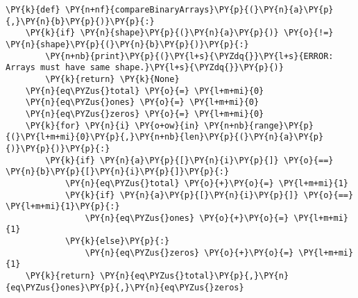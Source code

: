 
{\par%
\vspace{-1\baselineskip}%
}%
\begin{notebookcell}[]%
\begin{addmargin}[\cellleftmargin]{0em}%
{\smaller%
\par%
%
\vspace{-1\smallerfontscale}%
\begin{Verbatim}[commandchars=\\\{\}]
\PY{k}{def} \PY{n+nf}{compareBinaryArrays}\PY{p}{(}\PY{n}{a}\PY{p}{,}\PY{n}{b}\PY{p}{)}\PY{p}{:}
    \PY{k}{if} \PY{n}{shape}\PY{p}{(}\PY{n}{a}\PY{p}{)} \PY{o}{!=} \PY{n}{shape}\PY{p}{(}\PY{n}{b}\PY{p}{)}\PY{p}{:}
        \PY{n+nb}{print}\PY{p}{(}\PY{l+s}{\PYZdq{}}\PY{l+s}{ERROR: Arrays must have same shape.}\PY{l+s}{\PYZdq{}}\PY{p}{)}
        \PY{k}{return} \PY{k}{None}
    \PY{n}{eq\PYZus{}total} \PY{o}{=} \PY{l+m+mi}{0}
    \PY{n}{eq\PYZus{}ones} \PY{o}{=} \PY{l+m+mi}{0}
    \PY{n}{eq\PYZus{}zeros} \PY{o}{=} \PY{l+m+mi}{0}
    \PY{k}{for} \PY{n}{i} \PY{o+ow}{in} \PY{n+nb}{range}\PY{p}{(}\PY{l+m+mi}{0}\PY{p}{,}\PY{n+nb}{len}\PY{p}{(}\PY{n}{a}\PY{p}{)}\PY{p}{)}\PY{p}{:}
        \PY{k}{if} \PY{n}{a}\PY{p}{[}\PY{n}{i}\PY{p}{]} \PY{o}{==} \PY{n}{b}\PY{p}{[}\PY{n}{i}\PY{p}{]}\PY{p}{:}
            \PY{n}{eq\PYZus{}total} \PY{o}{+}\PY{o}{=} \PY{l+m+mi}{1}
            \PY{k}{if} \PY{n}{a}\PY{p}{[}\PY{n}{i}\PY{p}{]} \PY{o}{==} \PY{l+m+mi}{1}\PY{p}{:}
                \PY{n}{eq\PYZus{}ones} \PY{o}{+}\PY{o}{=} \PY{l+m+mi}{1}
            \PY{k}{else}\PY{p}{:}
                \PY{n}{eq\PYZus{}zeros} \PY{o}{+}\PY{o}{=} \PY{l+m+mi}{1}
    \PY{k}{return} \PY{n}{eq\PYZus{}total}\PY{p}{,}\PY{n}{eq\PYZus{}ones}\PY{p}{,}\PY{n}{eq\PYZus{}zeros}
\end{Verbatim}
%
\par%
\vspace{-1\smallerfontscale}}%
\end{addmargin}
\end{notebookcell}



